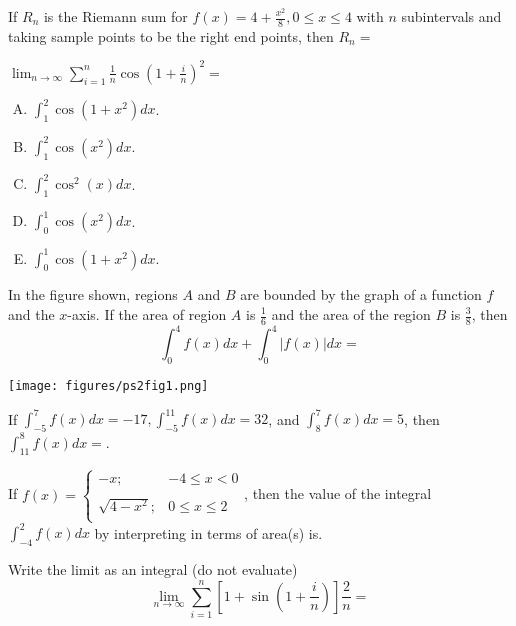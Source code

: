 \documentclass[
  course = {{MATH102 Calculus II}},
  quartile = {{2}},
  assignment = 2,
  firstexercise = 1,
  term = 202
]{aga-homework}
\begin{document}
\newpage

\problem  If $R_n$ is the Riemann sum for $f(x)= 4 + \frac{x^2}{8}, 0 \leq x \leq 4$
with $n$ subintervals and taking sample points to be the right end points, then $R_n =$


\newpage

\problem $\lim_{n\to \infty}\sum_{i=1}^n\frac{1}{n}\cos\left(1+\frac{i}{n}\right)^2=$

\begin{enumerate}[(A)]
  \item $\int_{1}^{2}\cos(1+x^2)dx$.
  \item $\int_{1}^{2}\cos(x^2)dx$.
  \item $\int_{1}^{2}\cos^2(x)dx$.
  \item $\int_{0}^{1}\cos(x^2)dx$.
  \item $\int_{0}^{1}\cos(1+x^2)dx$.
\end{enumerate}

\newpage


\problem
\begin{minipage}[t]{0.6\textwidth}
\vspace{0pt}
  In the figure shown, regions $A$ and $B$ are bounded by the graph of a function $f$ and the $x$-axis. If the area of region $A$ is $\frac{1}{6}$ and the area of the region $B$ is $\frac{3}{8}$, then
  \[
  \int_0^4f(x) dx + \int_{0}^{4}|f(x)| dx =
  \]
\end{minipage}
\begin{minipage}[r]{0.4\textwidth}
	\texttt{[image: figures/ps2fig1.png]}
\end{minipage}


\newpage

\problem If $\int_{-5}^7f(x)dx=-17, \int_{-5}^{11}f(x)dx=32$, and $\int_{8}^7f(x)dx=5$, then $\int_{11}^8f(x)dx=$.

\newpage

\problem If ${\displaystyle f(x) = \left\{\begin{array}{ll}
         -x; & -4\leq x <0 \\
         \\
         \sqrt{4-x^2}; & 0\leq x \leq 2 \\
       \end{array}\right.}$, then the value of the integral
       $ \displaystyle
       \int_{-4}^{2} f(x) dx
       $
       by interpreting in terms of area(s) is.


\newpage
\problem Write the limit as an integral (do not evaluate) \[\displaystyle \lim_{n\to \infty} \sum_{i=1}^{n}\left[1+\sin\left(1+\frac{i}{n}\right)\right]\frac{2}{n}=
\]
\end{document}
